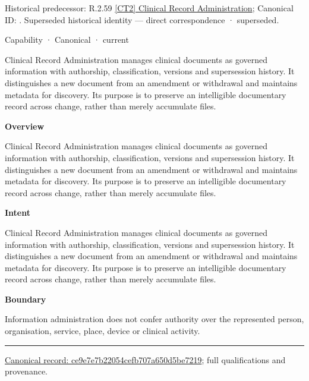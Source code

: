 {\small Historical predecessor: R.2.59 \hyperref[element:be3f2e695eda403fbce8118daf83d386]{[CT2] Clinical Record Administration}; Canonical ID: \texttt{}. Superseded historical identity — direct correspondence · superseded.}\par
\label{element:ce9e7e7b22054cefb707a650d5be7219}
{\small Capability · Canonical · current}\par

Clinical Record Administration manages clinical documents as governed information with authorship, classification, versions and supersession history. It distinguishes a new document from an amendment or withdrawal and maintains metadata for discovery. Its purpose is to preserve an intelligible documentary record across change, rather than merely accumulate files.



\textbf{Overview}



Clinical Record Administration manages clinical documents as governed information with authorship, classification, versions and supersession history. It distinguishes a new document from an amendment or withdrawal and maintains metadata for discovery. Its purpose is to preserve an intelligible documentary record across change, rather than merely accumulate files.



\textbf{Intent}



Clinical Record Administration manages clinical documents as governed information with authorship, classification, versions and supersession history. It distinguishes a new document from an amendment or withdrawal and maintains metadata for discovery. Its purpose is to preserve an intelligible documentary record across change, rather than merely accumulate files.



\textbf{Boundary}



Information administration does not confer authority over the represented person, organisation, service, place, device or clinical activity.



\medskip\hrule\medskip

{\footnotesize \href{../../../../../../../continuum/strategy/capability/ce9e7e7b22054cefb707a650d5be7219.md}{Canonical record: ce9e7e7b22054cefb707a650d5be7219}; full qualifications and provenance.}\par
